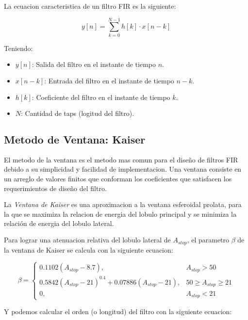 \documentclass[11pt,a4paper]{article}
\begin{document}
La ecuacion caracteristica de un filtro FIR es la siguiente:

\begin{equation}
    y[n] = \sum_{k=0}^{N-1} h[k] \cdot x[n-k]
\end{equation}

Teniendo:

\begin{itemize}
    \item $y[n]$: Salida del filtro en el instante de tiempo $n$.
    \item $x[n-k]$: Entrada del filtro en el instante de tiempo $n-k$.
    \item $h[k]$: Coeficiente del filtro en el instante de tiempo $k$.
    \item $N$: Cantidad de taps (logitud del filtro).
\end{itemize}

\subsection{Metodo de Ventana: Kaiser}

El metodo de la ventana es el metodo mas comun para el diseño de filtros FIR
debido a su simplicidad y facilidad de implementacion. Una ventana consiste en
un arreglo de valores finitos que conforman los coeficientes que satisfacen los
requerimientos de diseño del filtro.

La \textit{Ventana de Kaiser} es una aproximacion a la ventana esferoidal
prolata, para la que se maximiza la relacion de energia del lobulo principal y
se minimiza la relación de energia del lobulo lateral.

Para lograr una atenuacion relativa del lobulo lateral de $A_{stop}$, el
parametro $\beta$ de la ventana de Kaiser se calcula con la siguiente ecuacion:

\begin{equation}
    \beta = \begin{cases}
        0.1102(A_{stop} - 8.7),                                 & A_{stop} > 50            \\
        0.5842{(A_{stop} - 21)}^{0.4} + 0.07886(A_{stop} - 21), & 50 \geq A_{stop} \geq 21 \\
        0,                                                      & A_{stop} < 21
    \end{cases}
\end{equation}

Y podemos calcular el orden (o longitud) del filtro con la siguiente ecuacion:
\end{document}
